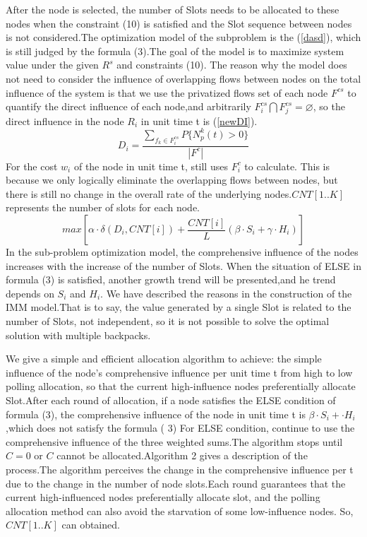 \documentclass[conference,compsoc]{IEEEtran}
\begin{document}
After the node is selected, the number of Slots needs to be allocated to these nodes when the constraint (10) is satisfied and the Slot sequence between nodes is not considered.The optimization model of the subproblem is the (\ref{dasd}), which is still judged by the formula (3).The goal of the model is to maximize system value under the given $R^s$ and constraints (10). The reason why the model does not need to consider the influence of overlapping flows between nodes on the total influence of the system is that we use the privatized flows set of each node $F^{cs}$ to quantify the direct influence of each node,and arbitrarily $F^{cs}_i \bigcap F^{cs}_j = \varnothing$, so the direct influence in the node $R_i$ in unit time t is (\ref{newDI}).
\begin{equation}
{D}_i=\frac{\sum_{f_k \in F^{cs}_i} P\{N_p^k(t)> 0\}}{|F^c|} 
\label{newDI}
\end{equation}
For the cost $w_i$ of the node in unit time t, still uses $F_i^c$ to calculate. This is because we only logically eliminate the overlapping flows between nodes, but there is still no change in the overall rate of the underlying nodes.$CNT[1..K]$ represents the number of slots for each node.
\begin{equation}
max [ \alpha \cdot \delta(D_i,CNT[i]) + \frac{CNT[i]}{L}(\beta \cdot S_i + \gamma \cdot H_i)  ]
\label{dasd}
\end{equation}
In the sub-problem optimization model, the comprehensive influence of the nodes increases with the increase of the number of Slots. When the situation of ELSE in formula (3) is satisfied, another growth trend will be presented,and he trend depends on $S_i$ and $H_i$. We have described the reasons in the construction of the IMM model.That is to say, the value generated by a single Slot is related to the number of Slots, not independent, so it is not possible to solve the optimal solution with multiple backpacks.

We give a simple and efficient allocation algorithm to achieve: the simple influence of the node's comprehensive influence per unit time t from high to low polling allocation, so that the current high-influence nodes preferentially allocate Slot.After each round of allocation, if a node satisfies the ELSE condition of formula (3), the comprehensive influence of the node in unit time t is $\beta \cdot S_i + \cdot H_i$,which does not satisfy the formula ( 3) For ELSE condition, continue to use the comprehensive influence of the three weighted sums.The algorithm stops until $C = 0$ or $C$ cannot be allocated.Algorithm 2 gives a description of the process.The algorithm perceives the change in the comprehensive influence per t due to the change in the number of node slots.Each round guarantees that the current high-influenced nodes preferentially allocate slot, and the polling allocation method can also avoid the starvation of some low-influence nodes. So, $CNT[1..K]$ can obtained.
\end{document}
